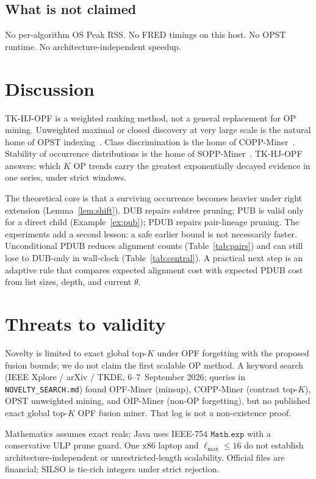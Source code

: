 \documentclass[preprint,12pt]{elsarticle}
\newcommand{\DUB}{\mathrm{DUB}}
\newcommand{\PDUB}{\mathrm{PDUB}}
\newcommand{\PUB}{\mathrm{PUB}}
\theoremstyle{plain}
\theoremstyle{definition}
\theoremstyle{remark}
\begin{document}
\subsection{What is not claimed}
No per-algorithm OS Peak RSS. No FRED timings on this host. No OPST runtime. No architecture-independent speedup.

\section{Discussion}
\label{sec:disc}

TK-HJ-OPF is a weighted ranking method, not a general replacement for OP mining. Unweighted maximal or closed discovery at very large scale is the natural home of OPST indexing~\cite{Li2026Indexing}. Class discrimination is the home of COPP-Miner~\cite{Wu2024COPP}. Stability of occurrence distributions is the home of SOPP-Miner~\cite{Zhang2026SOPP}. TK-HJ-OPF answers: which $K$ OP trends carry the greatest exponentially decayed evidence in one series, under strict windows.

The theoretical core is that a surviving occurrence becomes heavier under right extension (Lemma~\ref{lem:shift}). $\DUB$ repairs subtree pruning; $\PUB$ is valid only for a direct child (Example~\ref{ex:pub}); $\PDUB$ repairs pair-lineage pruning. The experiments add a second lesson: a safe earlier bound is not necessarily faster. Unconditional $\PDUB$ reduces alignment counts (Table~\ref{tab:pairs}) and can still lose to $\DUB$-only in wall-clock (Table~\ref{tab:central}). A practical next step is an adaptive rule that compares expected alignment cost with expected $\PDUB$ cost from list sizes, depth, and current $\theta$.

\section{Threats to validity}
\label{sec:threats}

Novelty is limited to exact global top-$K$ under OPF forgetting with the proposed fusion bounds; we do not claim the first scalable OP method. A keyword search (IEEE Xplore / arXiv / TKDE, 6--7~September 2026; queries in \texttt{NOVELTY\_SEARCH.md}) found OPF-Miner (minsup), COPP-Miner (contrast top-$K$), OPST unweighted mining, and OIP-Miner (non-OP forgetting), but no published exact global top-$K$ OPF fusion miner. That log is not a non-existence proof.

Mathematics assumes exact reals; Java uses IEEE-754 $\texttt{Math.exp}$ with a conservative ULP prune guard. One x86 laptop and $\ell_{\max}\le 16$ do not establish architecture-independent or unrestricted-length scalability. Official files are financial; SILSO is tie-rich integers under strict rejection.
\end{document}

